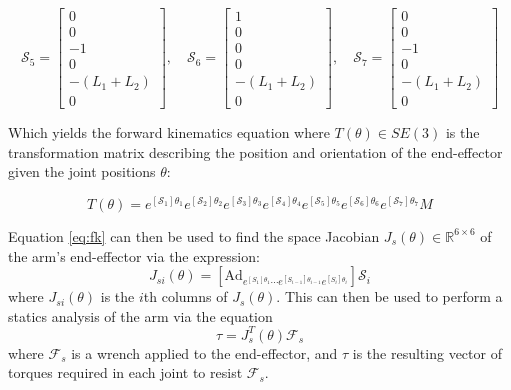 \documentclass[a4paper,11pt]{article}
\begin{document}
\begin{equation*}
    \mathcal{S}_{5} = \begin{bmatrix}
        0 \\ 0 \\ -1 \\ 
        0 \\ -(L_{1}+L_{2}) \\ 0
    \end{bmatrix}
    ,\quad
    \mathcal{S}_{6} = \begin{bmatrix}
        1 \\ 0 \\ 0 \\ 
        0 \\ -(L_{1}+L_{2}) \\ 0
    \end{bmatrix}
    ,\quad
    \mathcal{S}_{7} = \begin{bmatrix}
        0 \\ 0 \\ -1 \\ 
        0 \\ -(L_{1}+L_{2}) \\ 0
    \end{bmatrix}
\end{equation*}

Which yields the forward kinematics equation where $T(\theta) \in SE(3)$ is the transformation matrix describing the position and orientation of the end-effector given the joint positions $\theta$:

\begin{equation}\label{eq:fk}
    T(\theta) = 
    e^{\displaystyle [\mathcal{S}_{1}]\theta_{1}}
    e^{\displaystyle [\mathcal{S}_{2}]\theta_{2}}
    e^{\displaystyle [\mathcal{S}_{3}]\theta_{3}}
    e^{\displaystyle [\mathcal{S}_{4}]\theta_{4}}
    e^{\displaystyle [\mathcal{S}_{5}]\theta_{5}}
    e^{\displaystyle [\mathcal{S}_{6}]\theta_{6}}
    e^{\displaystyle [\mathcal{S}_{7}]\theta_{7}}
    M
\end{equation}

Equation \ref{eq:fk} can then be used to find the space Jacobian $J_{s}(\theta) \in \mathbb{R}^{6 \times 6}$ of the arm's end-effector via the expression:
\begin{equation}\label{eq:jacobian}
    J_{si}(\theta) = 
    \left[\mathrm{Ad}_{\displaystyle e^{\displaystyle [S_{1}]\theta_{1}}\cdots e^{\displaystyle [S_{i-1}]\theta_{i-1}}e^{\displaystyle [S_{i}]\theta_{i}}}\right]
    \mathcal{S}_{i}
\end{equation}
where $J_{si}(\theta)$ is the $i$th columns of $J_s(\theta)$. This can then be used to perform a statics analysis of the arm via the equation
\begin{equation}\label{eq:statics}
    \tau = J_{s}^{T}(\theta)\mathcal{F}_{s}
\end{equation}
where $\mathcal{F}_{s}$ is a wrench applied to the end-effector, and $\tau$ is the resulting vector of torques required in each joint to resist $\mathcal{F}_{s}$.
\end{document}

